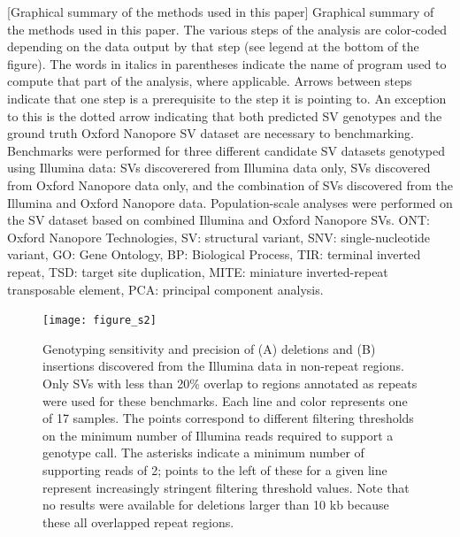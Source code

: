 \documentclass[12pt]{article}
\newenvironment{cfigure}
	{\begin{figure} \centering}
	{\end{figure}}
\begin{document}
	[Graphical summary of the methods used in this paper]{
		Graphical summary of the methods used in this paper.
		The various steps of the analysis are color-coded depending on the data output by that step (see legend at the bottom of the figure).
		The words in italics in parentheses indicate the name of program used to compute that part of the analysis, where applicable.
		Arrows between steps indicate that one step is a prerequisite to the step it is pointing to.
		An exception to this is the dotted arrow indicating that both predicted SV genotypes and the ground truth Oxford Nanopore SV dataset are necessary to benchmarking.
		Benchmarks were performed for three different candidate SV datasets genotyped using Illumina data: SVs discoverered from Illumina data only, SVs discovered from Oxford Nanopore data only, and the combination of SVs discovered from the Illumina and Oxford Nanopore data.
	Population-scale analyses were performed on the SV dataset based on combined Illumina and Oxford Nanopore SVs.
	ONT: Oxford Nanopore Technologies, SV: structural variant, SNV: single-nucleotide variant, GO: Gene Ontology, BP: Biological Process, TIR: terminal inverted repeat, TSD: target site duplication, MITE: miniature inverted-repeat transposable element, PCA: principal component analysis.
}

\clearpage%

\begin{cfigure}
	\texttt{[image: figure\_s2]}

	\caption[Sensitivity and precision of Illumina deletion and insertion genotyping in non-repeat regions]{
		Genotyping sensitivity and precision of (A) deletions and (B) insertions discovered from the Illumina data in non-repeat regions. 
		Only SVs with less than 20\% overlap to regions annotated as repeats were used for these benchmarks. 
		Each line and color represents one of 17 samples. 
		The points correspond to different filtering thresholds on the minimum number of Illumina reads required to support a genotype call.
		The asterisks indicate a minimum number of supporting reads of 2; points to the left of these for a given line represent increasingly stringent filtering threshold values.
		Note that no results were available for deletions larger than 10 kb because these all overlapped repeat regions.
	}

	\label{fig_s2}

\end{cfigure}
\end{document}
